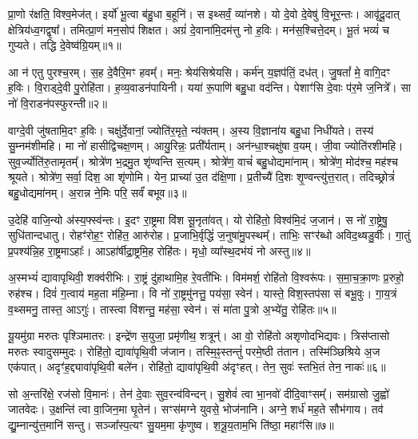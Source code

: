 प्रा॒णो र॑क्षति॒ विश्व॒मेज॑त्।
इर्यो॑ भू॒त्वा ब॑हु॒धा ब॒हूनि॑।
स इथ्सर्वं॒ व्या॑नशे।
यो दे॒वो दे॒वेषु॑ वि॒भूर॒न्तः।
आवृ॑दू॒दात् क्षेत्रिय॑ध्व॒गद्वृषा᳚।
तमित्प्रा॒णं मन॒सोप॑ शिक्षत।
अग्रं॑ दे॒वाना॑मि॒दम॑त्तु नो ह॒विः।
मन॑स॒श्चित्ते॒दम्।
भू॒तं भव्यं॑ च गुप्यते।
तद्धि दे॒वेष्व॑ग्रि॒यम्॥१॥

आ न॑ एतु पुरश्च॒रम्।
स॒ह दे॒वैरि॒मꣳ हवम्᳚।
मनः॒ श्रेय॑सिश्रेयसि।
कर्म॑न् य॒ज्ञप॑तिं॒ दध॑त्।
जु॒षतां᳚ मे॒ वागि॒दꣳ ह॒विः।
वि॒राड्दे॒वी पु॒रोहि॑ता।
ह॒व्य॒वाडन॑पायिनी।
यया॑ रू॒पाणि॑ बहु॒धा वद॑न्ति।
पेशाꣳ॑सि दे॒वाः प॑र॒मे ज॒नित्रे᳚।
सा नो॑ वि॒राडन॑पस्फुरन्ती॥२॥

वाग्दे॒वी जु॑षतामि॒दꣳ ह॒विः।
चक्षु॑र्दे॒वानां॒ ज्योति॑र॒मृते॒ न्य॑क्तम्।
अ॒स्य वि॒ज्ञाना॑य बहु॒धा निधी॑यते।
तस्य॑ सु॒म्नम॑शीमहि।
मा नो॑ हासीद्विचक्ष॒णम्।
आयु॒रिन्नः॒ प्रती᳚र्यताम्।
अन॑न्धा॒श्चक्षु॑षा व॒यम्।
जी॒वा ज्योति॑रशीमहि।
सुव॒र्ज्योति॑रु॒तामृतम्᳚।
श्रोत्रे॑ण भ॒द्रमु॒त शृ॑ण्वन्ति स॒त्यम्।
श्रोत्रे॑ण॒ वाचं॑ बहु॒धोद्यमा॑नाम्।
श्रोत्रे॑ण॒ मोद॑श्च॒ मह॑श्च श्रूयते।
श्रोत्रे॑ण॒ सर्वा॒ दिश॒ आ शृ॑णोमि।
येन॒ प्राच्या॑ उ॒त द॑क्षि॒णा।
प्र॒तीच्यै॑ दि॒शः शृ॒ण्वन्त्यु॑त्त॒रात्।
तदिच्छ्रोत्रं॑ बहु॒धोद्यमा॑नम्।
अ॒रान्न ने॒मिः परि॒ सर्वं॑ बभूव॥३॥\anuvakamend[अ॒ग्रि॒यमन॑पस्फुरन्ती स॒त्यꣳ स॒प्त च॑]

उ॒देहि॑ वाजि॒न्यो अ॑स्य॒फ्स्व॑न्तः।
इ॒दꣳ रा॒ष्ट्रमा वि॑श सू॒नृता॑वत्।
यो रोहि॑तो॒ विश्व॑मि॒दं ज॒जान॑।
स नो॑ रा॒ष्ट्रेषु॒ सुधि॑तान्दधातु।
रोहꣳ॑रोह॒ꣳ॒ रोहि॑त॒ आरु॑रोह।
प्र॒जाभि॒र्वृद्धिं॑ ज॒नुषा॑मु॒पस्थम्᳚।
ताभिः॒ सꣳर॑ब्धो अविद॒थ्षडु॒र्वीः।
गा॒तुं प्र॒पश्य॑न्नि॒ह रा॒ष्ट्रमा\-ऽहाः᳚।
आऽहा॑र्\mbox{}षीद्रा॒ष्ट्रमि॒ह रोहि॑तः।
मृधो॒ व्या᳚स्थ॒दभ॑यं नो अस्तु॥४॥

अ॒स्मभ्यं॑ द्यावापृथिवी॒ शक्व॑रीभिः।
रा॒ष्ट्रं दु॑हाथामि॒ह रे॒वती॑भिः।
विम॑मर्\mbox{}श॒ रोहि॑तो वि॒श्वरू॑पः।
स॒मा॒च॒क्रा॒णः प्र॒रुहो॒ रुह॑श्च।
दिवं॑ ग॒त्वाय॑ मह॒ता म॑हि॒म्ना।
वि नो॑ रा॒ष्ट्रमु॑नत्तु॒ पय॑सा॒ स्वेन॑।
यास्ते॒ विश॒स्तप॑सा सं बभू॒वुः।
गा॒य॒त्रं व॒थ्समनु॒ तास्त॒ आऽगुः॑।
तास्त्वा वि॑शन्तु॒ मह॑सा॒ स्वेन॑।
सं मा॑ता पु॒त्रो अ॒भ्ये॑तु॒ रोहि॑तः॥५॥

यू॒यमु॑ग्रा मरुतः पृश्ञिमातरः।
इन्द्रे॑ण स॒युजा॒ प्रमृ॑णीथ॒ शत्रून्॑।
आ वो॒ रोहि॑तो अशृणोदभिद्यवः।
त्रिस॑प्तासो मरुतः स्वादुसम्मुदः।
रोहि॑तो॒ द्यावा॑पृथि॒वी ज॑जान।
तस्मि॒ꣴ॒स्तन्तुं॑ परमे॒ष्ठी त॑तान।
तस्मि॑ञ्छिश्रिये अ॒ज एक॑पात्।
अदृꣳ॑ह॒द्द्यावा॑पृथि॒वी बले॑न।
रोहि॑तो॒ द्यावा॑पृथि॒वी अ॑दृꣳहत्।
तेन॒ सुवः॑ स्तभि॒तं तेन॒ नाकः॑॥६॥

सो अ॒न्तरि॑क्षे॒ रज॑सो वि॒मानः॑।
तेन॑ दे॒वाः सुव॒रन्व॑विन्दन्।
सु॒शेवं॑ त्वा भा॒नवो॑ दीदि॒वाꣳसम्᳚।
सम॑ग्रासो जु॒ह्वो॑ जातवेदः।
उ॒क्षन्ति॑ त्वा वा॒जिन॒मा घृ॒तेन॑।
सꣳस॑मग्ने युवसे॒ भोज॑नानि।
अग्ने॒ शर्ध॑ मह॒ते सौभ॑गाय।
तव॑ द्यु॒म्नान्यु॑त्त॒मानि॑ सन्तु।
सञ्जा᳚स्प॒त्यꣳ सु॒यम॒मा कृ॑णुष्व।
श॒त्रू॒य॒ताम॒भि ति॑ष्ठा॒ महाꣳ॑सि॥७॥\anuvakamend[अ॒स्त्वे॒तु॒ रोहि॑तो॒ नाको॒ महाꣳ॑सि]

